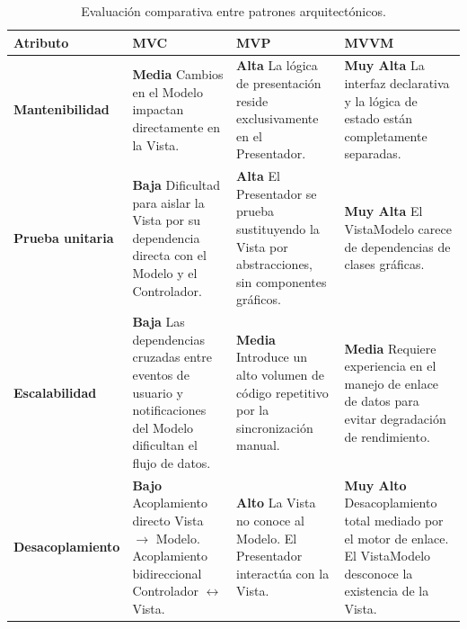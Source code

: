 \vspace{3\baselineskip}
\begin{table}[H]
    \centering
    \small
    \caption{Evaluación comparativa entre patrones arquitectónicos.}
    \label{tab:comparacion_patrones}
    \begin{tabularx}{\textwidth}{>{\hsize}Y >{\hsize}Y >{\hsize}Y >{\hsize}Y}
        \toprule
        \textbf{Atributo} & \textbf{MVC} & \textbf{MVP} & \textbf{MVVM} \\
        \midrule
        \textbf{Mantenibilidad} & 
        \textbf{Media}\newline
        Cambios en el Modelo impactan directamente en la Vista. & 
        \textbf{Alta}\newline
        La lógica de presentación reside exclusivamente en el Presentador. & 
        \textbf{Muy Alta}\newline
        La interfaz declarativa y la lógica de estado están completamente separadas. \\
        \midrule
        \textbf{Prueba unitaria} & 
        \textbf{Baja}\newline
        Dificultad para aislar la Vista por su dependencia directa con el Modelo y el Controlador. & 
        \textbf{Alta}\newline
        El Presentador se prueba sustituyendo la Vista por abstracciones, sin componentes gráficos. & 
        \textbf{Muy Alta}\newline
        El VistaModelo carece de dependencias de clases gráficas. \\
        \midrule
        \textbf{Escalabilidad} & 
        \textbf{Baja}\newline
        Las dependencias cruzadas entre eventos de usuario y notificaciones del Modelo dificultan el flujo de datos. & 
        \textbf{Media}\newline
        Introduce un alto volumen de código repetitivo por la sincronización manual. & 
        \textbf{Media}\newline
        Requiere experiencia en el manejo de enlace de datos para evitar degradación de rendimiento. \\
        \midrule
        \textbf{Desacoplamiento} & 
        \textbf{Bajo}\newline
        Acoplamiento directo Vista $\rightarrow$ Modelo.\newline
        Acoplamiento bidireccional Controlador $\leftrightarrow$ Vista. & 
        \textbf{Alto}\newline
        La Vista no conoce al Modelo.\newline
        El Presentador interactúa con la Vista. & 
        \textbf{Muy Alto}\newline
        Desacoplamiento total mediado por el motor de enlace.\newline
        El VistaModelo desconoce la existencia de la Vista. \\
        \bottomrule
    \end{tabularx}
\end{table}
\vspace{3\baselineskip}


